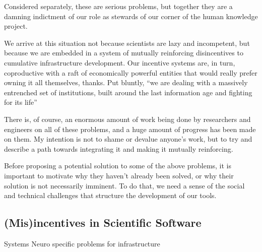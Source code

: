 \documentclass[10pt]{article}
\begin{document}
\begin{multicols}{2}
Considered separately, these are serious problems, but together they are
a damning indictment of our role as stewards of our corner of the human
knowledge project.

We arrive at this situation not because scientists are lazy and
incompetent, but because we are embedded in a system of mutually
reinforcing disincentives to cumulative infrastructure development. Our
incentive systems are, in turn, coproductive with a raft of economically
powerful entities that would really prefer owning it all themselves,
thanks. Put bluntly, ``we are dealing with a massively entrenched set of
institutions, built around the last information age and fighting for its
life'' \cite{bowkerInformationInfrastructureStudies2010} 

There is, of course, an enormous amount of work being done by
researchers and engineers on all of these problems, and a huge amount of
progress has been made on them. My intention is not to shame or devalue
anyone's work, but to try and describe a path towards integrating it and
making it mutually reinforcing.

Before proposing a potential solution to some of the above problems, it
is important to motivate why they haven't already been solved, or why
their solution is not necessarily imminent. To do that, we need a sense
of the social and technical challenges that structure the development of
our tools. 
\end{multicols}


\hypertarget{misincentives-in-scientific-software}{%
\subsection{(Mis)incentives in Scientific
Software}\label{misincentives-in-scientific-software}}

Systems Neuro {specific problems for infrastructure}
\end{document}
